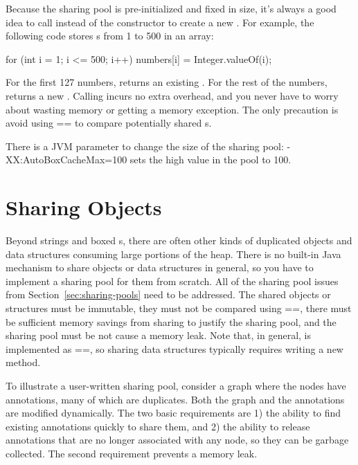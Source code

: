 Because the  sharing pool is pre-initialized and fixed in size,
it's always a good idea to call  instead of the constructor to
create a new . For example, the following code stores
s from 1 to 500 in an array:
\begin{shortlisting}
    for (int i = 1; i <= 500; i++) {
        numbers[i] = Integer.valueOf(i);
    }
\end{shortlisting}
For the first 127 numbers,  returns an existing . 
For the rest of the numbers,  returns a new
.  Calling  incurs no extra overhead,
and you never have to worry about wasting memory or getting a
memory exception. The only precaution is avoid using == to compare potentially
shared s.

There is a JVM parameter to change the size of the  sharing pool:
-XX:AutoBoxCacheMax=100 sets the high value in the pool to 100.

\section{Sharing Objects}

Beyond strings and boxed s, there are often other kinds of
duplicated objects and data structures consuming large portions of the heap. 
There is no built-in Java mechanism to share objects or data
structures in general, so you have to implement a sharing pool for them from
scratch. All of the sharing pool issues from Section~\ref{sec:sharing-pools} need to be
addressed. The shared objects or structures must be immutable, they must not be
compared using ==, there must be sufficient memory savings from sharing to
justify the sharing pool, and the sharing pool must be not cause a memory leak. 
Note that, in general,  is
implemented as ==, so sharing data structures typically requires writing a new
 method.

To illustrate a user-written sharing pool, consider a graph where the nodes
have annotations, many of which are duplicates. Both the graph and the
annotations are modified dynamically. The two basic requirements are 1) the
ability to find existing annotations quickly to share them, and 2) the ability
to release annotations that are no longer associated with any node, so they can
be garbage collected.  The second requirement prevents a memory leak. 


